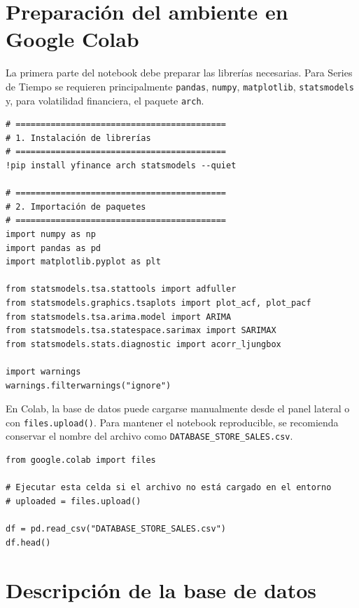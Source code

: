 \documentclass[12pt,a4paper]{article}
\begin{document}
\section{Preparación del ambiente en Google Colab}

\begin{markdowncell}
La primera parte del notebook debe preparar las librerías necesarias. Para Series de Tiempo se requieren principalmente \texttt{pandas}, \texttt{numpy}, \texttt{matplotlib}, \texttt{statsmodels} y, para volatilidad financiera, el paquete \texttt{arch}.
\end{markdowncell}

\begin{lstlisting}[style=pythonstyle]
# ==========================================
# 1. Instalación de librerías
# ==========================================
!pip install yfinance arch statsmodels --quiet

# ==========================================
# 2. Importación de paquetes
# ==========================================
import numpy as np
import pandas as pd
import matplotlib.pyplot as plt

from statsmodels.tsa.stattools import adfuller
from statsmodels.graphics.tsaplots import plot_acf, plot_pacf
from statsmodels.tsa.arima.model import ARIMA
from statsmodels.tsa.statespace.sarimax import SARIMAX
from statsmodels.stats.diagnostic import acorr_ljungbox

import warnings
warnings.filterwarnings("ignore")
\end{lstlisting}

\begin{markdowncell}
En Colab, la base de datos puede cargarse manualmente desde el panel lateral o con \texttt{files.upload()}. Para mantener el notebook reproducible, se recomienda conservar el nombre del archivo como \texttt{DATABASE\_STORE\_SALES.csv}.
\end{markdowncell}

\begin{lstlisting}[style=pythonstyle]
from google.colab import files

# Ejecutar esta celda si el archivo no está cargado en el entorno
# uploaded = files.upload()

df = pd.read_csv("DATABASE_STORE_SALES.csv")
df.head()
\end{lstlisting}

\section{Descripción de la base de datos}
\end{document}
